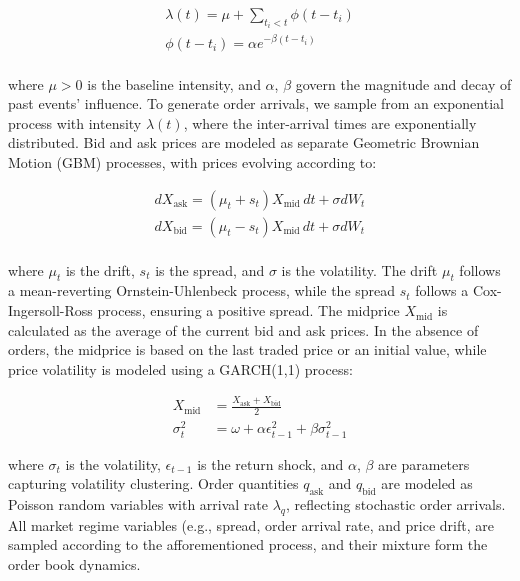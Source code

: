 \documentclass[11pt]{article}
\begin{document}
    \begin{gather*}
        \lambda(t) = \mu + \sum_{t_i < t} \phi(t - t_i)\\
        \phi(t - t_i) = \alpha e^{-\beta(t - t_i)}\\
    \end{gather*}

    where \( \mu > 0 \) is the baseline intensity, and \( \alpha \), \( \beta \) govern the magnitude and decay of past events' influence.
    To generate order arrivals, we sample from an exponential process with intensity \( \lambda(t) \),
    where the inter-arrival times are exponentially distributed.
    Bid and ask prices are modeled as separate Geometric Brownian Motion (GBM) processes, with prices evolving according to:

    \begin{gather*}
        dX_{\text{ask}} = (\mu_t + s_t) X_{\text{mid}} \, dt + \sigma dW_t\\
        dX_{\text{bid}} = (\mu_t - s_t) X_{\text{mid}} \, dt + \sigma dW_t\\
    \end{gather*}

    where \( \mu_t \) is the drift, \( s_t \) is the spread, and \( \sigma \) is the volatility.
    The drift \( \mu_t \) follows a mean-reverting Ornstein-Uhlenbeck process, while the spread \( s_t \) follows a Cox-Ingersoll-Ross process,
    ensuring a positive spread.
    The midprice \( X_{\text{mid}} \) is calculated as the average of the current bid and ask prices.
    In the absence of orders, the midprice is based on the last traded price or an initial value,
    while price volatility is modeled using a GARCH(1,1) process:

    \begin{equation*}
        \begin{aligned}
            X_{\text{mid}} &= \frac{X_{\text{ask}} + X_{\text{bid}}}{2} \\
            \sigma_t^2 &= \omega + \alpha \epsilon_{t-1}^2 + \beta \sigma_{t-1}^2
        \end{aligned}
    \end{equation*}

    where \( \sigma_t \) is the volatility, \( \epsilon_{t-1} \) is the return shock, and \( \alpha \), \( \beta \) are parameters capturing volatility clustering.
    Order quantities \( q_{\text{ask}} \) and \( q_{\text{bid}} \) are modeled as Poisson random variables with arrival rate \( \lambda_q \),
    reflecting stochastic order arrivals.
    All market regime variables (e.g., spread, order arrival rate, and price drift, are sampled according to the afforementioned process,
    and their mixture form the order book dynamics.
\end{document}
